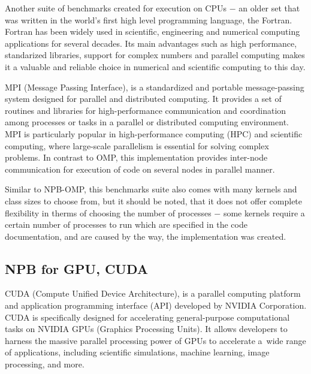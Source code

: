 Another suite of benchmarks created for execution on CPUs $-$ an older set that
was written in the world's first high level programming language, the Fortran.
Fortran has been widely used in scientific, engineering and numerical computing
applications for several decades. Its main advantages such as high performance,
standarized libraries, support for complex numbers and parallel computing makes
it a valuable and reliable choice in numerical and scientific computing to this
day.

MPI (Message Passing Interface), is a standardized and portable message-passing
system designed for parallel and distributed computing. It provides a set of
routines and libraries for high-performance communication and coordination among
processes or tasks in a parallel or distributed computing environment. MPI is
particularly popular in high-performance computing (HPC) and scientific computing,
where large-scale parallelism is essential for solving complex problems. In
contrast to OMP, this implementation provides inter-node communication for
execution of code on several nodes in parallel manner.

Similar to NPB-OMP, this benchmarks suite also comes with many kernels and class
sizes to choose from, but it should be noted, that it does not offer complete
flexibility in therms of choosing the number of processes $-$ some kernels
require a certain number of processes to run which are specified in the code
documentation, and are caused by the way, the implementation was created.

\subsection{NPB for GPU, CUDA}

CUDA (Compute Unified Device Architecture), is a parallel computing platform
and application programming interface (API) developed by NVIDIA Corporation.
CUDA is specifically designed for accelerating general-purpose computational
tasks on NVIDIA GPUs (Graphics Processing Units). It allows developers to harness
the massive parallel processing power of GPUs to accelerate a~wide range of
applications, including scientific simulations, machine learning, image
processing, and more.

